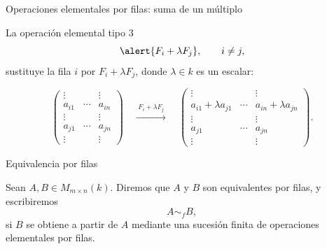 \begin{frame}{Operaciones elementales por filas: suma de un múltiplo}

La \alert{operación elemental tipo 3}
\[
\alert{F_i+\lambda F_j},
\qquad i\neq j,
\]
sustituye la fila \(i\) por \(F_i+\lambda F_j\), donde $\lambda\in k$ es un escalar:

\medskip

\[
\begin{pmatrix}
\vdots &&\vdots\\
a_{i1} & \cdots & a_{in}\\
\vdots &&\vdots\\
a_{j1} & \cdots & a_{jn}\\
\vdots &&\vdots
\end{pmatrix}
\quad
\xrightarrow{\;F_i+\lambda F_j\;}
\quad
\begin{pmatrix}
\vdots &&\vdots\\
a_{i1}+\lambda a_{j1}
&
\cdots
&
a_{in}+\lambda a_{jn}\\
\vdots &&\vdots\\
a_{j1} & \cdots & a_{jn}\\
\vdots &&\vdots
\end{pmatrix}.
\]

\end{frame}

\begin{frame}{Equivalencia por filas}

\begin{definition}
Sean \(A,B\in M_{m\times n}(k)\). Diremos que \(A\) y \(B\) son
\alert{equivalentes por filas}, y escribiremos
\[
A\sim_f B,
\]
si \(B\) se obtiene a partir de \(A\) mediante una sucesión finita de
operaciones elementales por filas.
\end{definition}

\end{frame}

